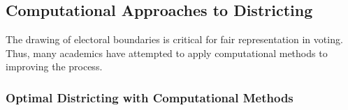 \documentclass{article}
\begin{document}









\subsection{Computational Approaches to Districting}

The drawing of electoral boundaries is critical for fair representation in voting. Thus, many academics have attempted to apply computational methods to improving the process.

\subsubsection{Optimal Districting with Computational Methods}
\end{document}
